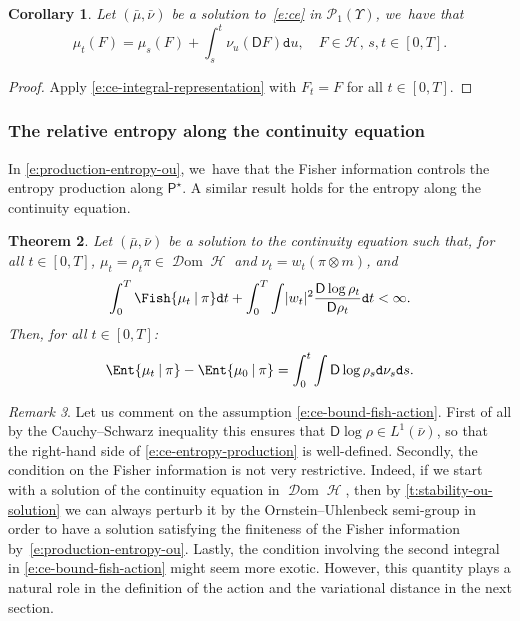 \documentclass[10pt]{amsart}
\newtheorem{theorem}{Theorem}[section]
\newtheorem{corollary}[theorem]{Corollary}
\theoremstyle{definition}
\theoremstyle{remark}
\newtheorem{remark}[theorem]{Remark}
\DeclarePairedDelimiter{\abs}{\lvert}{\rvert}
\newcommand{\given}[1][]{%
\nonscript\:#1\vert
\allowbreak
\nonscript\:
\mathopen{}}
\DeclareMathOperator{\ent}{\mathcal{H}}
\DeclareMathOperator{\dom}{\mathscr{D}om}
\begin{document}
\begin{corollary}\label{t:ce-one-function}
Let $(\bar{\mu}, \bar{\nu})$ be a solution to~\cref{e:ce} in $\mathscr{P}_{1}(\varUpsilon)$, we~have that
\begin{equation}\label{e:ce-integral-representation-G}
\mu_{t}(F) = \mu_{s}(F) + \int_{s}^{t} \nu_{u}(\mathsf{D} F) \mathtt{d} u, \quad F \in \mathscr{H},\, s,t \in [0,T].
\end{equation}
\end{corollary}
\begin{proof}
Apply \cref{e:ce-integral-representation} with $F_{t} = F$ for all $t \in [0,T]$.
\end{proof}

\subsubsection{The relative entropy along the continuity equation}

In \cref{e:production-entropy-ou}, we~have that the Fisher information controls the entropy production along $\mathsf{P}^{\star}$.
A similar result holds for the entropy along the continuity equation.

\begin{theorem}\label{t:ce-entropy-production}
Let $(\bar{\mu}, \bar{\nu})$ be a solution to the continuity equation such that, for all $t \in [0,T]$, $\mu_{t} = \rho_{t} \pi \in \dom \ent$ and $\nu_{t} = w_{t} (\pi \otimes m)$, and
\begin{equation}\label{e:ce-bound-fish-action}
\int_{0}^{T} \Fish{ \mu_{t} \given \pi } \mathtt{d} t + \int_{0}^{T} \int \abs{w_{t}}^{2} \frac{\mathsf{D} \log \rho_{t}}{\mathsf{D} \rho_{t}} \mathtt{d} t < \infty.
\end{equation}
Then, for all $t \in [0,T]$:
\begin{equation}\label{e:ce-entropy-production}
\Ent{\mu_{t} \given \pi} - \Ent{ \mu_{0} \given \pi } = \int_{0}^{t} \int \mathsf{D} \log \rho_{s} \mathtt{d} \nu_{s} \mathtt{d} s.
\end{equation}
\end{theorem}

\begin{remark}
Let us comment on the assumption \cref{e:ce-bound-fish-action}.
First of all by the Cauchy--Schwarz inequality this ensures that $\mathsf{D} \log \rho \in L^{1}(\bar{\nu})$, so that the right-hand side of \cref{e:ce-entropy-production} is well-defined.
Secondly, the condition on the Fisher information is not very restrictive.
Indeed, if we start with a solution of the continuity equation in $\dom \ent$, then by \cref{t:stability-ou-solution} we can always perturb it by the Ornstein--Uhlenbeck semi-group in order to have a solution satisfying the finiteness of the Fisher information by~\cref{e:production-entropy-ou}.
Lastly, the condition involving the second integral in \cref{e:ce-bound-fish-action} might seem more exotic.
However, this quantity plays a natural role in the definition of the action and the variational distance in the next section.
\end{remark}
\end{document}
